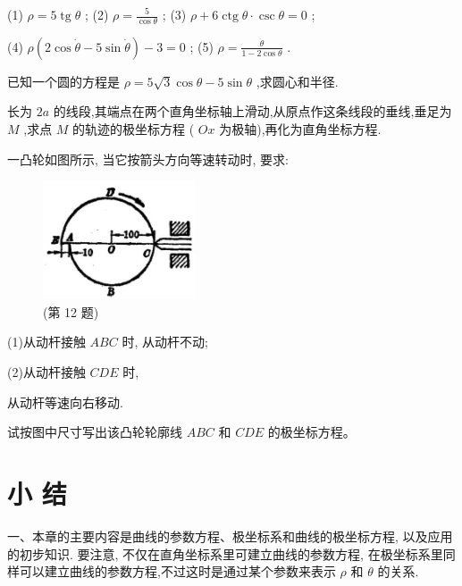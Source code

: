 \documentclass[lang=cn,newtx,10.5pt,scheme=chinese]{elegantbook}
\begin{document}
\begin{problemset}[习 题 十 四]
(1) \(\rho = 5\operatorname{tg}\theta\) ; (2) \(\rho = \frac{5}{\cos \theta }\) ; (3) \(\rho + 6\operatorname{ctg}\theta \cdot \csc \theta = 0\) ;

(4) \(\rho \left( {2\cos \dot{\theta } - 5\sin \dot{\theta }}\right) - 3 = 0\) ; (5) \(\rho = \frac{\dot{\theta }}{1 - 2\cos \theta }\) .

\item 已知一个圆的方程是 \(\rho = 5\sqrt{3}\cos \theta - 5\sin \theta\) ,求圆心和半径.

\item 长为 \({2a}\) 的线段,其端点在两个直角坐标轴上滑动,从原点作这条线段的垂线,垂足为 \(M\) ,求点 \(M\) 的轨迹的极坐标方程 ( \({Ox}\) 为极轴),再化为直角坐标方程.

\item 一凸轮如图所示, 当它按箭头方向等速转动时, 要求:

\begin{figure}[h]
  \centering
  \includegraphics[max width=0.4\textwidth]{images/01912cc2-ffb6-728e-9ae7-b113ff05c64b_189_903948.jpg}
  \caption{(第 12 题)}
\end{figure}



(1)从动杆接触 \({ABC}\) 时, 从动杆不动;

(2)从动杆接触 \({CDE}\) 时,

从动杆等速向右移动.

试按图中尺寸写出该凸轮轮廓线 \({ABC}\) 和 \({CDE}\) 的极坐标方程。

\end{problemset}

\chapter*{小 结}

一、本章的主要内容是曲线的参数方程、极坐标系和曲线的极坐标方程, 以及应用的初步知识. 要注意, 不仅在直角坐标系里可建立曲线的参数方程, 在极坐标系里同样可以建立曲线的参数方程,不过这时是通过某个参数来表示 \(\rho\) 和 \(\theta\) 的关系.
\end{document}
